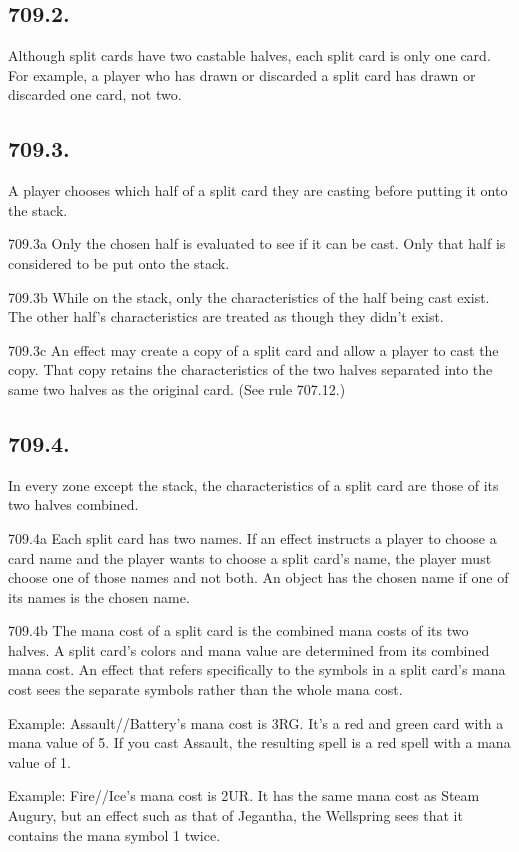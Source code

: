\subsection*{709.2.}
Although split cards have two castable halves, each split card is only one card. For example, a player who has drawn or discarded a split card has drawn or discarded one card, not two.

\subsection*{709.3.}
A player chooses which half of a split card they are casting before putting it onto the stack.

709.3a Only the chosen half is evaluated to see if it can be cast. Only that half is considered to be put onto the stack.

709.3b While on the stack, only the characteristics of the half being cast exist. The other half’s characteristics are treated as though they didn’t exist.

709.3c An effect may create a copy of a split card and allow a player to cast the copy. That copy retains the characteristics of the two halves separated into the same two halves as the original card. (See rule 707.12.)

\subsection*{709.4.}
In every zone except the stack, the characteristics of a split card are those of its two halves combined.

709.4a Each split card has two names. If an effect instructs a player to choose a card name and the player wants to choose a split card’s name, the player must choose one of those names and not both. An object has the chosen name if one of its names is the chosen name.

709.4b The mana cost of a split card is the combined mana costs of its two halves. A split card’s colors and mana value are determined from its combined mana cost. An effect that refers specifically to the symbols in a split card’s mana cost sees the separate symbols rather than the whole mana cost.

Example: Assault//Battery’s mana cost is {3}{R}{G}. It’s a red and green card with a mana value of 5. If you cast Assault, the resulting spell is a red spell with a mana value of 1.

Example: Fire//Ice’s mana cost is {2}{U}{R}. It has the same mana cost as Steam Augury, but an effect such as that of Jegantha, the Wellspring sees that it contains the mana symbol {1} twice.

